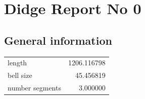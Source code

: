 \documentclass{article}
\begin{document}
\section{Didge Report No 0}

\subsection{General information}
\begin{centering}

\begin{figure}[!htb]
\end{figure}
\begin{tabular}{lr}
\toprule
         length & 1206.116798 \\
      bell size &   45.456819 \\
number segments &    3.000000 \\
\bottomrule
\end{tabular}
\end{centering}
\end{document}
